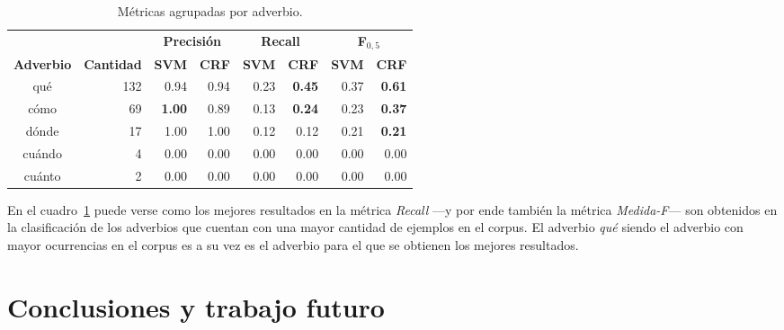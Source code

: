 \documentclass[runningheads,a4paper]{llncs}
\begin{document}
\begin{table}[ht]
 	\renewcommand{\arraystretch}{1.3}
	\renewcommand{\tabcolsep}{3pt}
	\caption{Métricas agrupadas por adverbio.}
	\label{table:metricas-adv}
	\centering
	\begin{tabular}{c r r r r r r r}
		\hline
		\multicolumn{2}{c}{} 
			& \multicolumn{2}{c}{\textbf{Precisión}} 
			& \multicolumn{2}{c}{\textbf{Recall}} 
			& \multicolumn{2}{c}{\textbf{F$_{0,5}$}} \\
		\multicolumn{1}{c}{\textbf{Adverbio}} & \multicolumn{1}{c}{\textbf{Cantidad}}
			& \multicolumn{1}{r}{\textbf{SVM}} & \multicolumn{1}{r}{\textbf{CRF}}
			& \multicolumn{1}{r}{\textbf{SVM}} & \multicolumn{1}{r}{\textbf{CRF}}
			& \multicolumn{1}{r}{\textbf{SVM}} & \multicolumn{1}{r}{\textbf{CRF}} \\		
		\hline\hline
		qué & 132 	& 0.94 & 0.94 			& 0.23 & \textbf{0.45} 	& 0.37 & \textbf{0.61} \\
		cómo & 69 	& \textbf{1.00} & 0.89 	& 0.13 & \textbf{0.24} 	& 0.23 & \textbf{0.37} \\
		dónde & 17 	& 1.00 & 1.00 			& 0.12 & 0.12			& 0.21 & \textbf{0.21} \\
		cuándo & 4 	& 0.00 & 0.00 			& 0.00 & 0.00 			& 0.00 & 0.00 \\
		cuánto & 2 	& 0.00 & 0.00 			& 0.00 & 0.00 			& 0.00 & 0.00 \\
		\hline
	\end{tabular}
\end{table}

En el cuadro~\ref{table:metricas-adv} puede verse como los mejores resultados en la métrica \emph{Recall} ---y por ende también la métrica \emph{Medida-F}--- son obtenidos en la clasificación de los adverbios que cuentan con una mayor cantidad de ejemplos en el corpus. El adverbio \emph{qué} siendo el adverbio con mayor ocurrencias en el corpus es a su vez es el adverbio para el que se obtienen los mejores resultados. 

\section{Conclusiones y trabajo futuro}
\label{sec:Conclusiones}
\end{document}

